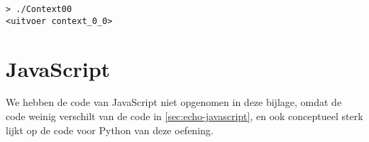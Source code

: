 \begin{verbatim}
> ./Context00
<uitvoer context_0_0>
\end{verbatim}

\section{JavaScript}\label{sec:echo-function-javascript}

We hebben de code van JavaScript niet opgenomen in deze bijlage, omdat de code weinig verschilt van de code in \cref{sec:echo-javascript}, en ook conceptueel sterk lijkt op de code voor Python van deze oefening.
